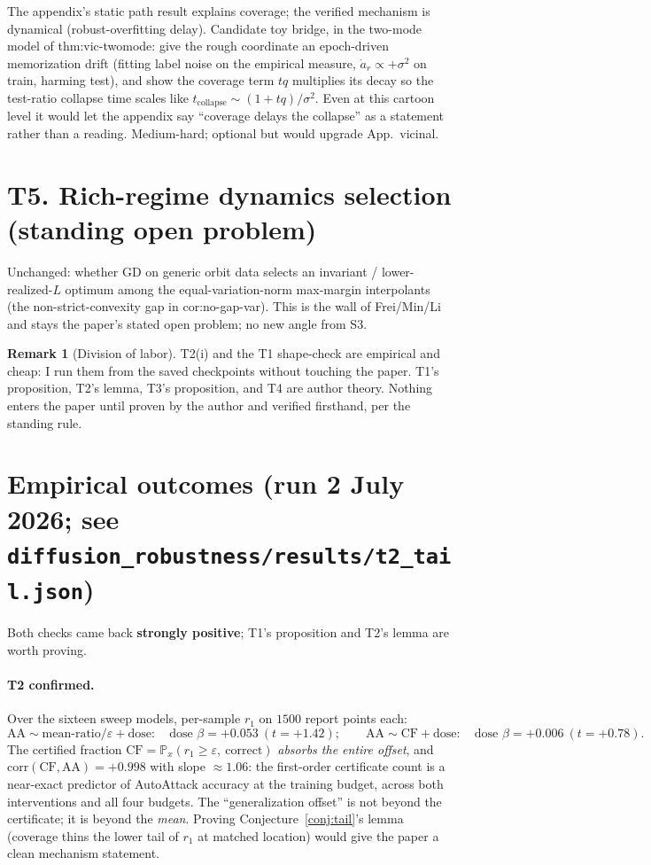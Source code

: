 \documentclass[11pt]{article}
\theoremstyle{definition}
\newtheorem{remark}{Remark}
\newcommand{\Prob}{\mathbb{P}}
\begin{document}
The appendix's static path result explains coverage; the verified mechanism is dynamical
(robust-overfitting delay). Candidate toy bridge, in the two-mode model of thm:vic-twomode: give the
rough coordinate an epoch-driven memorization drift (fitting label noise on the empirical measure,
$\dot a_r\propto+\sigma^2$ on train, harming test), and show the coverage term $tq$ multiplies its
decay so the test-ratio collapse time scales like $t_{\mathrm{collapse}}\sim(1+tq)/\sigma^2$.
Even at this cartoon level it would let the appendix say ``coverage delays the collapse'' as a
statement rather than a reading. Medium-hard; optional but would upgrade App.~vicinal.

\section*{T5. Rich-regime dynamics selection (standing open problem)}

Unchanged: whether GD on generic orbit data selects an invariant / lower-realized-$L$ optimum among
the equal-variation-norm max-margin interpolants (the non-strict-convexity gap in
cor:no-gap-var). This is the wall of Frei/Min/Li and stays the paper's stated open problem; no new
angle from S3.

\begin{remark}[Division of labor]
T2(i) and the T1 shape-check are empirical and cheap: I run them from the saved checkpoints without
touching the paper. T1's proposition, T2's lemma, T3's proposition, and T4 are author theory.
Nothing enters the paper until proven by the author and verified firsthand, per the standing rule.
\end{remark}

\section*{Empirical outcomes (run 2 July 2026; see \texttt{diffusion\_robustness/results/t2\_tail.json})}

Both checks came back \textbf{strongly positive}; T1's proposition and T2's lemma are worth proving.

\paragraph{T2 confirmed.} Over the sixteen sweep models, per-sample $r_1$ on $1500$ report points each:
\[
\text{AA} \sim \text{mean-ratio}/\varepsilon + \text{dose}: \quad \text{dose } \beta=+0.053\ (t=+1.42);
\qquad
\text{AA} \sim \mathrm{CF} + \text{dose}: \quad \text{dose } \beta=+0.006\ (t=+0.78).
\]
The certified fraction $\mathrm{CF}=\Prob_x(r_1\ge\varepsilon,\ \text{correct})$ \emph{absorbs the
entire offset}, and $\mathrm{corr}(\mathrm{CF},\mathrm{AA})=+0.998$ with slope $\approx1.06$: the
first-order certificate count is a near-exact predictor of AutoAttack accuracy at the training
budget, across both interventions and all four budgets. The ``generalization offset'' is not beyond
the certificate; it is beyond the \emph{mean}. Proving Conjecture~\ref{conj:tail}'s lemma (coverage
thins the lower tail of $r_1$ at matched location) would give the paper a clean mechanism statement.
\end{document}
